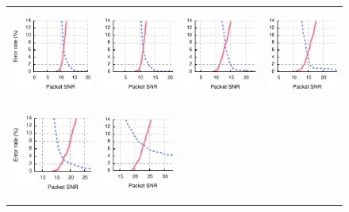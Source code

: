 \begin{figure}[p]
\begin{leftfullpage}
\begin{tabular}{cccc}
	\midrule
	\includegraphics[height=1.2in]{figures/delivery_figures/goodbad/packet_snr_goodbad_8.pdf} &
	\includegraphics[height=1.2in]{figures/delivery_figures/goodbad/packet_snr_goodbad_9.pdf} &
	\includegraphics[height=1.2in]{figures/delivery_figures/goodbad/packet_snr_goodbad_10.pdf} &
	\includegraphics[height=1.2in]{figures/delivery_figures/goodbad/packet_snr_goodbad_11.pdf} \\
	\includegraphics[height=1.2in]{figures/delivery_figures/goodbad/packet_snr_goodbad_12.pdf} &
	\includegraphics[height=1.2in]{figures/delivery_figures/goodbad/packet_snr_goodbad_13.pdf} &

\end{tabular}
\end{leftfullpage}
\end{figure}
